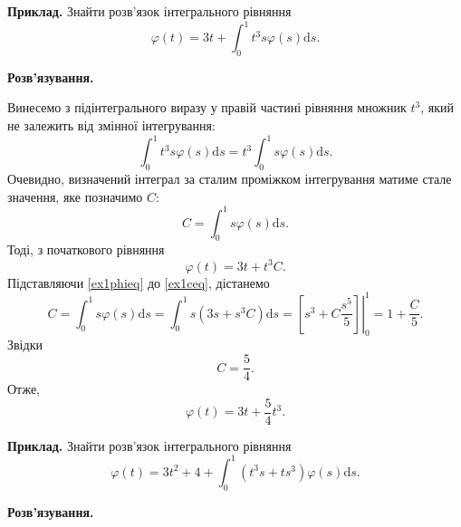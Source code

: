\documentclass[14pt,twoside]{extreport}
\theoremstyle{mystyle}
\numberwithin{equation}{chapter}
\begin{document}
\begin{small}
\textbf{Приклад.} Знайти розв'язок інтегрального рівняння
\[
 \varphi(t) = 3t + \int_{0}^{1} t^3 s \varphi(s) \mathrm{d}s.
\]

\textbf{Розв'язування.}

Винесемо з підінтегрального виразу у правій частині рівняння множник $t^3$, який не залежить від змінної інтегрування:
\[
 \int_{0}^{1} t^3 s \varphi(s) \mathrm{d}s= t^3 \int_{0}^{1} s \varphi(s) \mathrm{d}s.
\]
Очевидно, визначений інтеграл за сталим проміжком інтегрування матиме стале значення, яке позначимо $C$:
\begin{equation}\label{ex1ceq}
 C = \int_{0}^{1} s \varphi(s) \mathrm{d}s.
\end{equation}
Тоді, з початкового рівняння
\begin{equation}\label{ex1phieq}
 \varphi(t) = 3t + t^3 C.
\end{equation}
Підставляючи \eqref{ex1phieq} до \eqref{ex1ceq}, дістанемо
\begin{equation}
 C = \int_{0}^{1} s \varphi(s) \mathrm{d}s = \int_{0}^{1} s \left(3s + s^3 C\right) \mathrm{d}s = \left.\left[s^3+C\dfrac{s^5}{5}\right]\right|_{0}^{1} = 1+ \dfrac{C}{5}.
\end{equation}
Звідки
\[
 C=\dfrac{5}{4}.
\]
Отже,
\[
 \varphi(t) = 3t + \dfrac{5}{4} t^3.
\]

\textbf{Приклад.} Знайти розв'язок інтегрального рівняння
\[
 \varphi(t) = 3t^2 + 4 + \int_{0}^{1} \left(t^3 s + t s^3\right)\varphi(s) \mathrm{d}s.
\]

\textbf{Розв'язування.}


\end{small}
\end{document}
